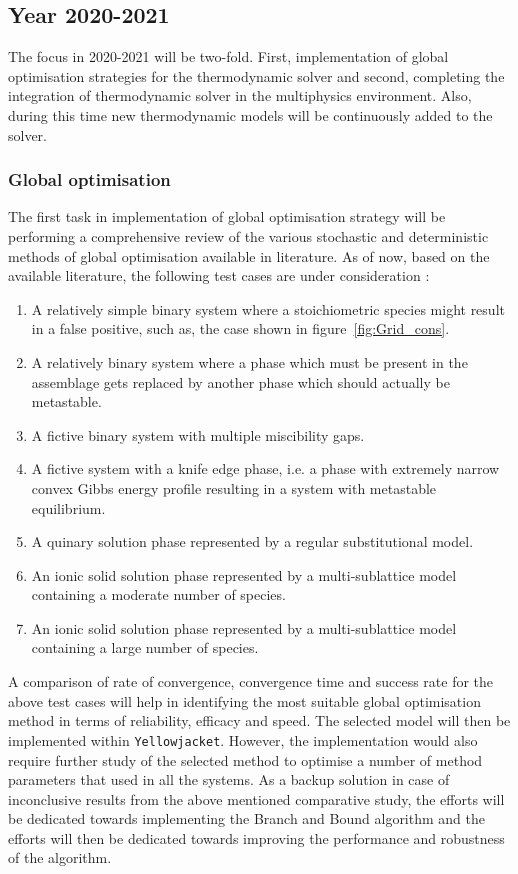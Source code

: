 	\subsection{Year 2020-2021}
	The focus in 2020-2021 will be two-fold. First, implementation of global optimisation strategies for the thermodynamic solver and second, completing the integration of thermodynamic solver in the multiphysics environment. Also, during this time new thermodynamic models will be continuously added to the solver. 
	
	\subsubsection{Global optimisation}
	The first task in implementation of global optimisation strategy will be performing a comprehensive review of the various stochastic and deterministic methods of global optimisation available in literature. As of now, based on the available literature, the following test cases are under consideration \cite{Piro16}:
	\begin{enumerate}
		\item A relatively simple binary system where a stoichiometric species might result in a false positive, such as, the case shown in figure~\ref{fig:Grid_cons}.
		\item A relatively binary system where a phase which must be present in the assemblage gets replaced by another phase which should actually be metastable.
		\item A fictive binary system with multiple miscibility gaps.
		\item A fictive system with a knife edge phase, i.e. a phase with extremely narrow convex Gibbs energy profile resulting in a system with metastable equilibrium.
		\item A quinary solution phase represented by a regular substitutional model. 
		\item An ionic solid solution phase represented by a multi-sublattice model containing a moderate number of species.
		\item An ionic solid solution phase represented by a multi-sublattice model containing a large number of species.
		
	\end{enumerate} 
	A comparison of rate of convergence, convergence time and success rate for the above test cases will help in identifying the most suitable global optimisation method in terms of reliability, efficacy and speed. The selected model will then be implemented within \texttt{Yellowjacket}. However, the implementation would also require further study of the selected method to optimise a number of method parameters that  used in all the systems. As a backup solution in case of inconclusive results from the above mentioned comparative study, the efforts will be dedicated towards implementing the Branch and Bound algorithm and the efforts will then be dedicated towards improving the performance and robustness of the algorithm.
	
